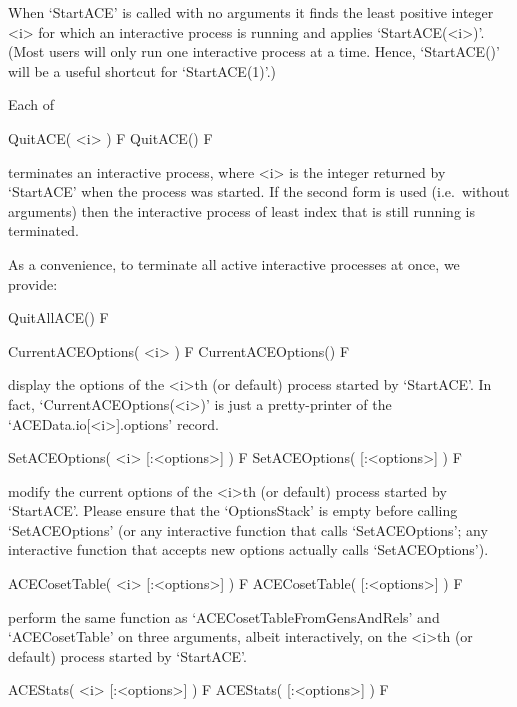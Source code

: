 When `StartACE' is  called  with  no  arguments  it  finds  the  least
positive integer <i> for which an interactive process is  running  and
applies `StartACE(<i>)'. (Most users will  only  run  one  interactive
process at a time. Hence, `StartACE()' will be a useful  shortcut  for
`StartACE(1)'.)

Each of

\>QuitACE( <i> ) F
\>QuitACE() F

terminates an interactive {\ACE} process, where  <i>  is  the  integer
returned by `StartACE' when the process was  started.  If  the  second
form is used (i.e.~without arguments) then the interactive process  of
least index that is still running is terminated.

As a convenience, to terminate all active interactive {\ACE} processes
at once, we provide:

\>QuitAllACE() F


\>CurrentACEOptions( <i> ) F
\>CurrentACEOptions() F

display the options of the  <i>th  (or  default)  process  started  by
`StartACE'. In fact, `CurrentACEOptions(<i>)' is just a pretty-printer
of the `ACEData.io[<i>].options' record.

\>SetACEOptions( <i> [:<options>] ) F
\>SetACEOptions( [:<options>] ) F

modify the current options of the <i>th (or default)  process  started
by `StartACE'. Please ensure that the `OptionsStack' is  empty  before
calling  `SetACEOptions'  (or  any  interactive  function  that  calls
`SetACEOptions'; any interactive function  that  accepts  new  options
actually calls `SetACEOptions').


\>ACECosetTable( <i> [:<options>] ) F
\>ACECosetTable( [:<options>] ) F

perform  the  same  function  as  `ACECosetTableFromGensAndRels'   and
`ACECosetTable' on three arguments, albeit interactively, on the <i>th
(or default) process started by `StartACE'.

\>ACEStats( <i> [:<options>] ) F
\>ACEStats( [:<options>] ) F

